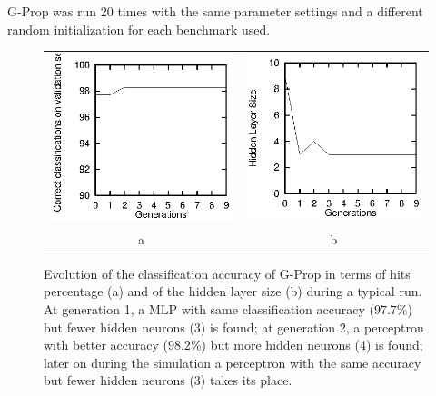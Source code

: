 \documentclass{elsart}
\begin{document}
G-Prop was run 20 times with the same parameter settings and a different random initialization for each benchmark used.

\begin{figure}
\begin{center}
\begin{tabular}{cc}
\includegraphics{hit.eps} & \includegraphics{size.eps} \\
a & b
\end{tabular}
\caption{\small{Evolution of the classification accuracy of G-Prop in terms of hits percentage (a) and of the hidden layer size (b) during a typical run. At generation 1, a MLP with same classification accuracy ($97.7\%$) but fewer hidden neurons (3) is found; at generation 2, a perceptron with better accuracy ($98.2\%$) but more hidden neurons (4) is found; later on during the simulation a perceptron with the same accuracy but fewer hidden neurons (3) takes its place.}}
\label{fig:graf}
\end{center}
\end{figure}
\end{document}
